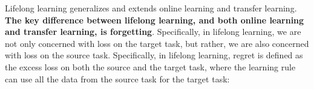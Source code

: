 \documentclass{article}
\begin{document}


Lifelong learning generalizes and extends online learning and transfer learning.  \textbf{The key difference between lifelong learning, and both online learning and transfer learning, is forgetting}.  Specifically, in lifelong learning, we are not only concerned with loss on the target task, but rather, we are also concerned with loss on the source task.  Specifically, in lifelong learning, regret is defined as the excess loss on both the source and the target task, where the learning rule can use all the data from the source task for the target task:
\end{document}
